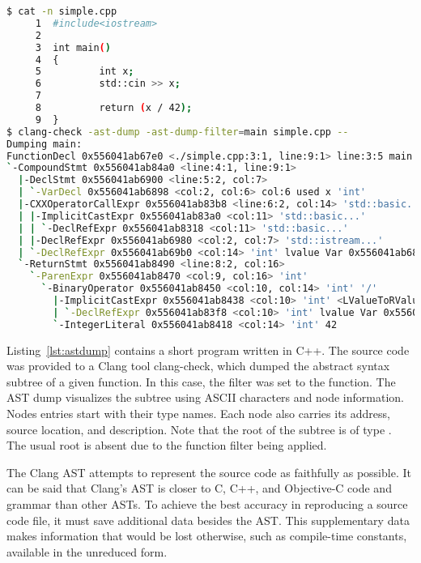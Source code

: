 \begin{lstlisting}[caption=Clang AST Dump, language=bash, 
label={lst:astdump}, basicstyle=\tiny, numbers=none]
$ cat -n simple.cpp
     1  #include<iostream>
     2
     3  int main()
     4  {
     5          int x;
     6          std::cin >> x;
     7
     8          return (x / 42);
     9  } 
$ clang-check -ast-dump -ast-dump-filter=main simple.cpp --
Dumping main:
FunctionDecl 0x556041ab67e0 <./simple.cpp:3:1, line:9:1> line:3:5 main 'int ()'
`-CompoundStmt 0x556041ab84a0 <line:4:1, line:9:1>
  |-DeclStmt 0x556041ab6900 <line:5:2, col:7>
  | `-VarDecl 0x556041ab6898 <col:2, col:6> col:6 used x 'int'
  |-CXXOperatorCallExpr 0x556041ab83b8 <line:6:2, col:14> 'std::basic...'
  | |-ImplicitCastExpr 0x556041ab83a0 <col:11> 'std::basic...'
  | | `-DeclRefExpr 0x556041ab8318 <col:11> 'std::basic...'
  | |-DeclRefExpr 0x556041ab6980 <col:2, col:7> 'std::istream...'
  | `-DeclRefExpr 0x556041ab69b0 <col:14> 'int' lvalue Var 0x556041ab6898 'x' 'int'
  `-ReturnStmt 0x556041ab8490 <line:8:2, col:16>
    `-ParenExpr 0x556041ab8470 <col:9, col:16> 'int'
      `-BinaryOperator 0x556041ab8450 <col:10, col:14> 'int' '/'
        |-ImplicitCastExpr 0x556041ab8438 <col:10> 'int' <LValueToRValue>
        | `-DeclRefExpr 0x556041ab83f8 <col:10> 'int' lvalue Var 0x556041ab6898 'x' 'int'
        `-IntegerLiteral 0x556041ab8418 <col:14> 'int' 42
\end{lstlisting}

Listing~\ref{lst:astdump} contains a short program written in C++.
The source code was provided to a Clang tool clang-check, which
dumped the abstract syntax subtree of a given function.
In this case, the filter was set to the  function.
The AST dump visualizes the subtree using ASCII characters
and node information.
Nodes entries start with their type names. 
Each node also carries its address, source location, and description.
Note that the root of the subtree is of type .
The usual root  is absent due to the function
filter being applied.

The Clang AST attempts to represent the source code as faithfully 
as possible. 
It can be said that Clang's AST is closer to C, C++, 
and Objective-C code and grammar than other ASTs. 
To achieve the best accuracy in reproducing a source code file, 
it must save additional data besides the AST. 
This supplementary data makes information that would be lost 
otherwise, such as compile-time constants, available 
in the unreduced form. 

